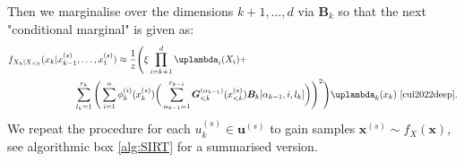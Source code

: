 Then we marginalise over the dimensions $k+1 , \dots, d$ via $\bm{B}_k$ so that the next "conditional marginal" is given as:
\begin{align}\begin{split} 
	 f_{X_k|X_{<k}}(x_k|x^{(s)}_{k-1},\dots,x^{(s)}_1) \approx \frac{1}{z}
\Bigg( 
\xi \prod_{i=k+1}^{d} \uplambda_i(X_i) +&  \\
\sum_{l_{k} = 1}^{r_{k}} \Bigg( \sum_{i = 1}^{n}  \phi^{(i)}_k(x^{(s)}_k) \bigg( \sum_{\alpha_{k-1} = 1}^{r_{k-1}} \bm{G}^{(\alpha_{k-1})}_{<k}(x^{(s)}_{<k}) &\bm{B}_k[\alpha_{k-1},i,l_k] \bigg) \Bigg)^2 \Bigg) \uplambda_k(x_k) \, \,  \text{\cite[Eq. 31]{cui2022deep}}.
	\end{split} 
	\label{eq:CurrMarg} 
\end{align}
We repeat the procedure for each $u^{(s)}_k \in \bm{u}^{(s)}$ to gain samples $\bm{x}^{(s)} \sim f_{X}(\bm{x})$, see algorithmic box \ref{alg:SIRT} for a summarised version.






